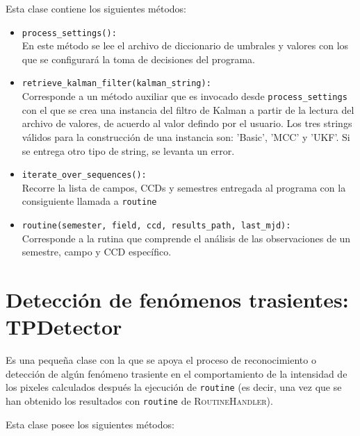 Esta clase contiene los siguientes m\'etodos:
\begin{itemize}
\item \texttt{process\_settings():}\\
En este m\'etodo se lee el archivo de diccionario de umbrales y valores con los que se configurar\'a la toma de decisiones del programa.
\bigskip

\item \texttt{retrieve\_kalman\_filter(kalman\_string):}\\
Corresponde a un m\'etodo auxiliar que es invocado desde \texttt{process\_settings} con el que se crea una instancia del filtro de Kalman a partir de la lectura del archivo de valores, de acuerdo al valor defindo por el usuario. Los tres strings v\'alidos para la construcci\'on de una instancia son: 'Basic', 'MCC' y 'UKF'. Si se entrega otro tipo de string, se levanta un error.
\bigskip
  
\item \texttt{iterate\_over\_sequences():}\\
Recorre la lista de campos, CCDs y semestres entregada al programa con la consiguiente llamada a \texttt{routine}
\bigskip

\item \texttt{routine(semester, field, ccd, results\_path, last\_mjd):}\\
Corresponde a la rutina que comprende el an\'alisis de las observaciones de un semestre, campo y CCD espec\'ifico. 
\end{itemize}  
\bigskip

\section{Detecci\'on de fen\'omenos trasientes: \textbf{TPDetector}}
Es una peque\~na clase con la que se apoya el proceso de reconocimiento o detecci\'on de alg\'un fen\'omeno trasiente en el comportamiento de la intensidad de los pixeles calculados despu\'es la ejecuci\'on de \texttt{routine} (es decir, una vez que se han obtenido los resultados con \texttt{routine} de \textsc{RoutineHandler}).
\bigskip

Esta clase posee los siguientes m\'etodos:

